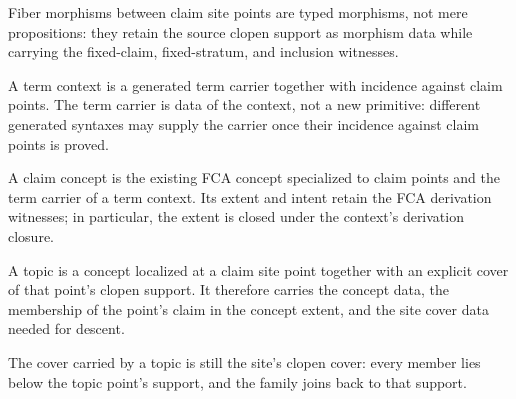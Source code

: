 \begin{theorem}\label{thm:claim-fiberhom-support}\leanok{}
Fiber morphisms between claim site points are typed morphisms, not mere
propositions: they retain the source clopen support as morphism data while
carrying the fixed-claim, fixed-stratum, and inclusion witnesses.
\end{theorem}

\begin{proposition}\label{thm:claim-term-context}\leanok{}
A term context is a generated term carrier together with incidence against
claim points.  The term carrier is data of the context, not a new primitive:
different generated syntaxes may supply the carrier once their incidence against
claim points is proved.
\end{proposition}

\begin{proposition}\label{thm:claim-concept}\leanok{}
A claim concept is the existing FCA concept specialized to claim points and the
term carrier of a term context.  Its extent and intent retain the FCA derivation
witnesses; in particular, the extent is closed under the context's derivation
closure.
\end{proposition}

\begin{proposition}\label{thm:claim-topic}\leanok{}
A topic is a concept localized at a claim site point together with an explicit
cover of that point's clopen support.  It therefore carries the concept data,
the membership of the point's claim in the concept extent, and the site cover
data needed for descent.
\end{proposition}

\begin{theorem}\label{thm:claim-topic-cover-fiber-local}\leanok{}
The cover carried by a topic is still the site's clopen cover: every member lies
below the topic point's support, and the family joins back to that support.
\end{theorem}

